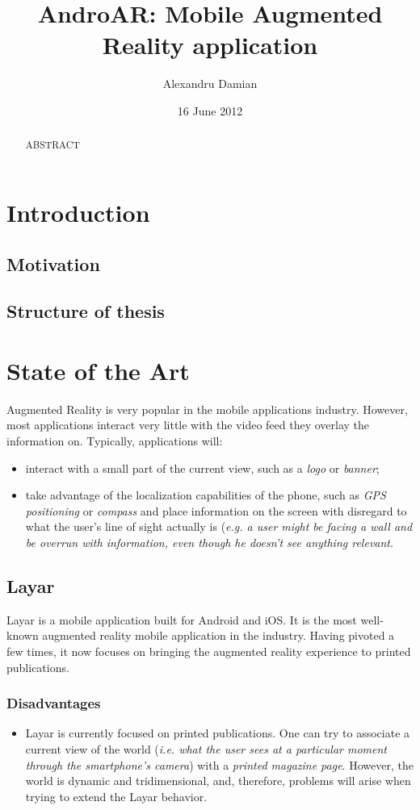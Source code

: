 \documentclass[a4paper,onecolumn,oneside,titlepage,11pt]{article}
\title{AndroAR: Mobile Augmented Reality application}
\author{Alexandru Damian}
\date{16 June 2012}
\begin{document}
\maketitle
\begin{abstract}
ABSTRACT
\end{abstract}
\tableofcontents

\clearpage
\section{Introduction}
\subsection{Motivation}
\subsection{Structure of thesis}


\clearpage
\section{State of the Art}
Augmented Reality is very popular in the mobile applications industry. However, most applications interact very little with the video feed they overlay the information on. Typically, applications will:
\begin{itemize}
	\item interact with a small part of the current view, such as a \emph{logo} or \emph{banner};
	\item take advantage of the localization capabilities of the phone, such as \emph{GPS positioning} or \emph{compass} and place information on the screen with disregard to what the user's line of sight actually is (\emph{e.g. a user might be facing a wall and be overrun with information, even though he doesn't see anything relevant}.
\end{itemize}
\subsection{Layar}
Layar is a mobile application built for Android and iOS. It is the most well-known augmented reality mobile application in the industry. Having pivoted a few times, it now focuses on bringing the augmented reality experience to printed publications.
\subsubsection*{Disadvantages}
\begin{itemize}
	\item Layar is currently focused on printed publications. One can try to associate a current view of the world (\emph{i.e. what the user sees at a particular moment through the smartphone's camera}) with a \emph{printed magazine page}. However, the world is dynamic and tridimensional, and, therefore, problems will arise when trying to extend the Layar behavior.
\end{itemize}
\end{document}
